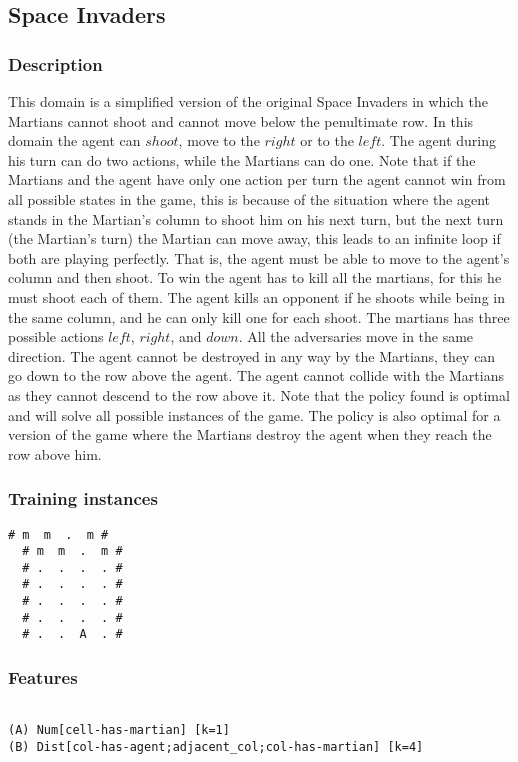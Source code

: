 \documentclass[a4paper]{article}
\begin{document}
\subsection{Space Invaders}

\subsubsection{Description}
This domain is a simplified version of the original Space Invaders in which the Martians cannot shoot and cannot move below the penultimate row. In this domain the agent can $shoot$, move to the $right$ or to the $left$. The agent during his turn can do two actions, while the Martians can do one. Note that if the Martians and the agent have only one action per turn the agent cannot win from all possible states in the game, this is because of the situation where the agent stands in the Martian's column to shoot him on his next turn, but the next turn (the Martian's turn) the Martian can move away, this leads to an infinite loop if both are playing perfectly. That is, the agent must be able to move to the agent's column and then shoot. To win the agent has to kill all the martians, for this he must shoot each of them. The agent kills an opponent if he shoots while being in the same column, and he can only kill one for each shoot. The martians has three possible actions $left$, $right$, and $down$. All the adversaries move in the same direction. The agent cannot be destroyed in any way by the Martians, they can go down to the row above the agent. The agent cannot collide with the Martians as they cannot descend to the row above it. Note that the policy found is optimal and will solve all possible instances of the game. The policy is also optimal for a version of the game where the Martians destroy the agent when they reach the row above him.

\subsubsection{Training instances}
\begin{Verbatim}[fontsize=\footnotesize]
  # m  m  .  m #
  # m  m  .  m #
  # .  .  .  . #
  # .  .  .  . #
  # .  .  .  . #
  # .  .  .  . #
  # .  .  A  . #
\end{Verbatim}

\subsubsection{Features}
\begin{Verbatim}[fontsize=\footnotesize]

(A) Num[cell-has-martian] [k=1]
(B) Dist[col-has-agent;adjacent_col;col-has-martian] [k=4]
\end{Verbatim}
\end{document}
